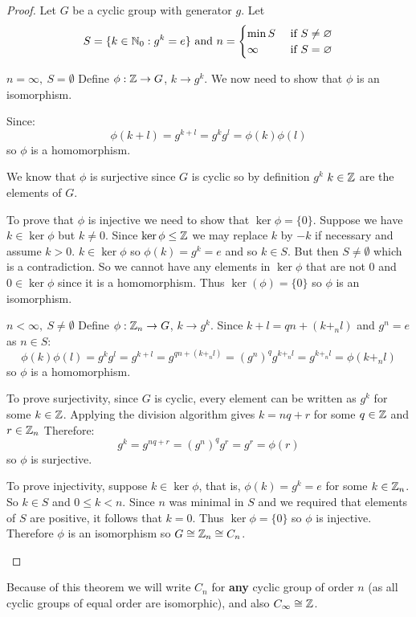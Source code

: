 \documentclass[../main.tex]{subfiles}
\begin{document}
\begin{proof}
  Let $G$ be a cyclic group with generator $g$.
  Let
  \[
    S = \{k \in \mathbb{N}_0 : g^{k} = e\}\text{ and }
    n = \begin{cases}
    \min S & \text{ if } S \neq \varnothing \\
    \infty & \text{ if } S = \varnothing
    \end{cases}
  \]
  \begin{proofcases}
    \begin{case}{$n = \infty,\ S = \emptyset$}
      Define $\phi: \mathbb{Z} \to G$, $k \to g^{k}$.
      We now need to show that $\phi$ is an isomorphism.

      Since:
      \[
        \phi(k + l) = g^{k + l} = g^{k}g^{l} = \phi(k)\phi(l)
      \]
      so $\phi$ is a homomorphism.

      We know that $\phi$ is surjective since $G$ is cyclic so by definition $g^{k}$ $k \in \mathbb{Z}$ are the elements of $G$.

      To prove that $\phi$ is injective we need to show that $\ker \phi = \{0\}$.
      Suppose we have $k \in \ker \phi$ but $k \neq 0$.
      Since $\ker \phi \leq \mathbb{Z}$ we may replace $k$ by $-k$ if necessary and assume $k > 0$.
      $k \in \ker \phi$ so $\phi(k) = g^{k} = e$ and so $k \in S$.
      But then $S \neq \emptyset$ which is a contradiction.
      So we cannot have any elements in $\ker \phi$ that are not 0 and $0 \in \ker \phi$ since it is a homomorphism.
      Thus $\ker(\phi) = \{0\}$ so $\phi$ is an isomorphism.
    \end{case}
    \begin{case}{$n < \infty,\ S \neq \emptyset$}
      Define $\phi: \mathbb{Z}_n \to G$, $k \to g^{k}$.
      Since $k + l = qn + (k +_n l)$ and $g^{n} = e$ as $n \in S$:
      \[
        \phi(k)\phi(l) = g^{k}g^{l} = g^{k + l} = g^{qn + (k +_n l)} = (g^{n})^{q} g^{k +_n l} = g^{k +_n l} = \phi(k +_n l)
      \]
      so $\phi$ is a homomorphism.

      To prove surjectivity, since $G$ is cyclic, every element can be written as $g^{k}$ for some $k \in \mathbb{Z}$.
      Applying the division algorithm gives $k = nq + r$ for some $q \in \mathbb{Z}$ and $r \in \mathbb{Z}_n$
      Therefore:
      \[
        g^{k} = g^{nq + r} = (g^{n})^{q}g^{r} = g^{r} = \phi(r)
      \]
      so $\phi$ is surjective.

      To prove injectivity, suppose $k \in \ker \phi$, that is, $\phi(k) = g^{k} = e$ for some $k \in \mathbb{Z}_n$.
      So $k \in S$ and $0 \leq k < n$.
      Since $n$ was minimal in $S$ and we required that elements of $S$ are positive, it follows that $k = 0$.
      Thus $\ker \phi = \{0\}$ so $\phi$ is injective.
      Therefore $\phi$ is an isomorphism so $G \cong \mathbb{Z}_n \cong C_n$.
    \end{case}
  \end{proofcases}
\end{proof}
\begin{remark}[Notation]
  Because of this theorem we will write $C_n$ for \textbf{any} cyclic group of order $n$ (as all cyclic groups of equal order are isomorphic), and also $C_{\infty} \cong \mathbb{Z}$.
\end{remark}
\end{document}
